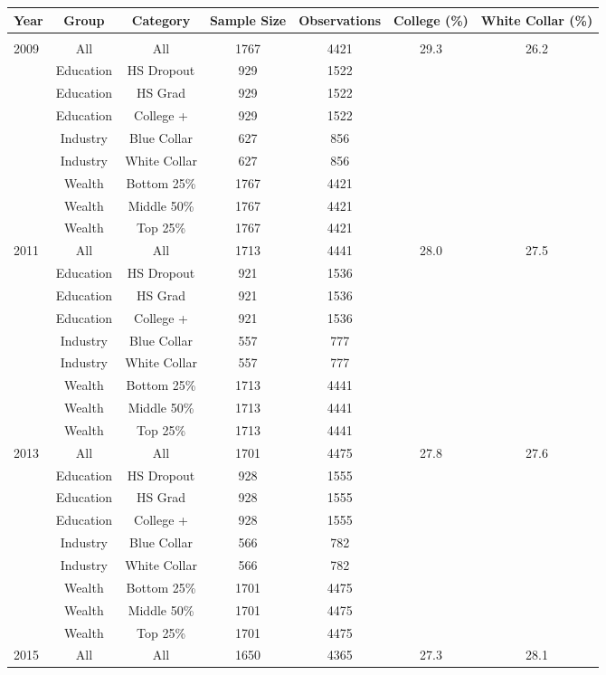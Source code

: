 \documentclass[12pt]{article}
\begin{document}
\begin{tabular}{||l|c|c|c|c|c|c||}
  Year & Group & Category & Sample Size & Observations & College (\%) & White Collar (\%) \\
  \hline\hline \\
  2009 & All & All & 1767 & 4421 & 29.3 & 26.2 \\
  & Education & HS Dropout & 929 & 1522 & & \\
  & Education & HS Grad & 929 & 1522 & & \\
  & Education & College + & 929 & 1522 & & \\
  & Industry & Blue Collar & 627 & 856 & & \\
  & Industry & White Collar & 627 & 856 & & \\
  & Wealth & Bottom 25\% & 1767 & 4421 & & \\
  & Wealth & Middle 50\% & 1767 & 4421 & & \\
  & Wealth & Top 25\% & 1767 & 4421 & & \\
  2011 & All & All & 1713 & 4441 & 28.0 & 27.5 \\
  & Education & HS Dropout & 921 & 1536 & & \\
  & Education & HS Grad & 921 & 1536 & & \\
  & Education & College + & 921 & 1536 & & \\
  & Industry & Blue Collar & 557 & 777 & & \\
  & Industry & White Collar & 557 & 777 & & \\
  & Wealth & Bottom 25\% & 1713 & 4441 & & \\
  & Wealth & Middle 50\% & 1713 & 4441 & & \\
  & Wealth & Top 25\% & 1713 & 4441 & & \\
  2013 & All & All & 1701 & 4475 & 27.8 & 27.6 \\
  & Education & HS Dropout & 928 & 1555 & & \\
  & Education & HS Grad & 928 & 1555 & & \\
  & Education & College + & 928 & 1555 & & \\
  & Industry & Blue Collar & 566 & 782 & & \\
  & Industry & White Collar & 566 & 782 & & \\
  & Wealth & Bottom 25\% & 1701 & 4475 & & \\
  & Wealth & Middle 50\% & 1701 & 4475 & & \\
  & Wealth & Top 25\% & 1701 & 4475 & & \\
  2015 & All & All & 1650 & 4365 & 27.3 & 28.1 \\

\end{tabular}
\end{document}
